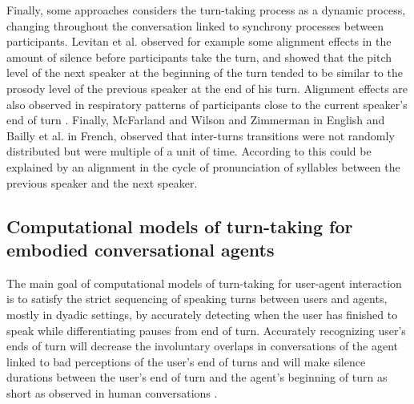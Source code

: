 Finally, some approaches considers the turn-taking process as a dynamic process, changing throughout the conversation linked to synchrony processes between participants. Levitan et al. \citep{levitan_entrainment_2015} observed for example some
alignment effects in the amount of silence before participants
take the turn, and showed that the pitch level of
the next speaker at the beginning of the turn tended to
be similar to the prosody level of the previous speaker
at the end of his turn. 
Alignment effects are also observed in respiratory patterns of participants close to the current speaker's end of turn \citep{mcfarland_respiratory_2001}.
Finally, McFarland \citep{mcfarland_respiratory_2001} and Wilson and Zimmerman\citep{wilson_structure_1986} in English and Bailly et al. \citep{bailly_pauses_2012} in French, observed that inter-turns transitions were not randomly distributed but were multiple of a unit of time. According to \citep{wilson_oscillator_2005} this could be explained by an alignment in the cycle of pronunciation of syllables between
the previous speaker and the next speaker.


\subsection{Computational models of turn-taking for embodied conversational agents}
\label{comp_modelling}


The main goal of computational models of turn-taking for user-agent interaction is to satisfy the strict sequencing of speaking turns between users and agents, mostly in
dyadic settings, by accurately detecting when the user has finished to speak while differentiating pauses from end of turn. Accurately recognizing user's ends of turn
will decrease the involuntary overlaps in conversations of the agent linked to bad perceptions of the user's end of turns and will make silence durations between the user's end of turn and the agent's beginning of turn as short as observed
in human conversations \citep{balentine_debouncing_1997,ward_root_2005,raux_optimizing_2012,
jonsdottir_distributed_2013}.

